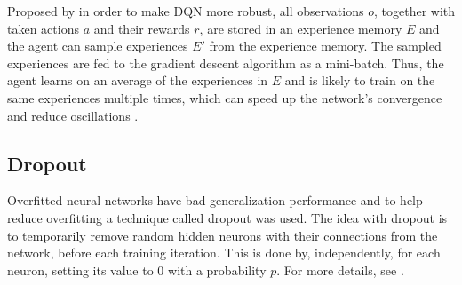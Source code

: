 Proposed by \cite{Mnih2015} in order to make DQN more robust, all observations $o$, together with taken actions $a$ and their rewards $r$, are stored in an experience memory $E$ and the agent can sample experiences $E'$ from the experience memory. The sampled experiences are fed to the gradient descent algorithm as a mini-batch. Thus, the agent learns on an average of the experiences in $E$ and is likely to train on the same experiences multiple times, which can speed up the network's convergence and reduce oscillations \cite{Lin1992Self-ImprovingTeaching}.

\subsection{Dropout}
Overfitted neural networks have bad generalization performance \cite{Hinton2012ImprovingDetectors} and to help reduce overfitting a technique called dropout was used. The idea with dropout is to temporarily remove random hidden neurons with their connections from the network, before each training iteration. This is done by, independently, for each neuron, setting its value to 0 with a probability $p$. For more details, see \cite{Srivastava2014Dropout:Overfitting}. 


